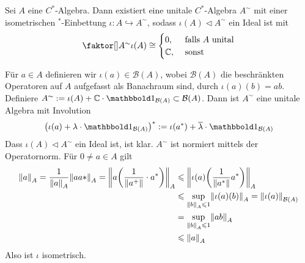\begin{satz}
	Sei $A$ eine $C^*$-Algebra. Dann existiert eine unitale $C^*$-Algebra $A^\sim$ mit einer isometrischen ${}^*$-Einbettung $\iota \colon A \hookrightarrow A^\sim$, sodass
	$\iota(A) \lhd A^\sim$ ein Ideal ist mit 
	\[
		\Faktor{A^\sim}{\iota(A)} \cong \begin{cases}
			0, &\text{ falls }A \text{ unital} \\
			\mathbb{C} , &\text{ sonst }  
		\end{cases}
	\]
\end{satz}
\begin{beweis}
	Für $a \in A$ definieren wir $\iota(a) \in \mathcal{B}(A)$, wobei $\mathcal{B}(A)$ die beschränkten Operatoren auf $A$ aufgefasst als Banachraum sind, durch
	$\iota(a)(b)=ab$. Definiere $A^\sim := \iota(A) + \mathbb{C} \cdot \ind_{\mathcal{B}(A)} \subset \mathcal{B}(A)$. Dann ist $A^\sim$ eine unitale Algebra mit Involution
	\[
		\enbrace*{\iota(a)+\lambda \cdot \ind_{\mathcal{B}(A)}}^* := \iota(a^*) + \overline{\lambda} \cdot \ind_{\mathcal{B}(A)}
	\]
	Dass $\iota(A) \lhd A^\sim$ ein Ideal ist, ist klar. $A^\sim$ ist normiert mittels der Operatornorm. Für $0 \neq a \in A$ gilt  
	\begin{align}
		\norm{a}_A = \frac{1}{\norm{a}_A}\norm{aa*}_A = \norm{a \enbrace*{\frac{1}{\norm{a^+} } \cdot a^*}}_A &\le \norm{\iota(a) \enbrace*{\frac{1}{\norm{a^*}}a^* }}_A \\
		&\le \sup_{\norm{b}_A \le 1} \norm{\iota(a)(b)}_A = \norm{\iota(a)}_{\mathcal{B}(A)} \\
		&= \sup_{\norm{b}_A \le 1} \norm{ab}_A \\
		&\le \norm{a}_A   
	\end{align}
	Also ist $\iota$ isometrisch.
\end{beweis}










\cleardoubleoddemptypage
{}
\setcounter{page}{1}

\printindex
\listoffigures
\todototoc
{}
